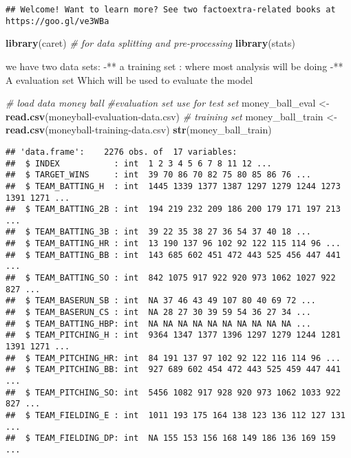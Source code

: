 \documentclass[
]{article}
\newenvironment{Shaded}{\begin{snugshade}}{\end{snugshade}}
\newcommand{\CommentTok}[1]{\textcolor[rgb]{0.56,0.35,0.01}{\textit{#1}}}
\newcommand{\FunctionTok}[1]{\textcolor[rgb]{0.13,0.29,0.53}{\textbf{#1}}}
\newcommand{\NormalTok}[1]{#1}
\newcommand{\OtherTok}[1]{\textcolor[rgb]{0.56,0.35,0.01}{#1}}
\newcommand{\StringTok}[1]{\textcolor[rgb]{0.31,0.60,0.02}{#1}}
\begin{document}
\begin{verbatim}
## Welcome! Want to learn more? See two factoextra-related books at https://goo.gl/ve3WBa
\end{verbatim}

\begin{Shaded}
\begin{Highlighting}[]
\FunctionTok{library}\NormalTok{(caret)  }\CommentTok{\# for data splitting and pre{-}processing}
\FunctionTok{library}\NormalTok{(stats) }
\end{Highlighting}
\end{Shaded}

we have two data sets: -** a training set : where most analysis will be
doing -** A evaluation set Which will be used to evaluate the model

\begin{Shaded}
\begin{Highlighting}[]
\CommentTok{\# load data money ball }
\CommentTok{\#evaluation set use for test set }
\NormalTok{money\_ball\_eval }\OtherTok{\textless{}{-}} \FunctionTok{read.csv}\NormalTok{(}\StringTok{\textquotesingle{}moneyball{-}evaluation{-}data.csv\textquotesingle{}}\NormalTok{)}
\CommentTok{\# training  set }
\NormalTok{money\_ball\_train }\OtherTok{\textless{}{-}} \FunctionTok{read.csv}\NormalTok{(}\StringTok{\textquotesingle{}moneyball{-}training{-}data.csv\textquotesingle{}}\NormalTok{)}
\FunctionTok{str}\NormalTok{(money\_ball\_train)}
\end{Highlighting}
\end{Shaded}

\begin{verbatim}
## 'data.frame':    2276 obs. of  17 variables:
##  $ INDEX           : int  1 2 3 4 5 6 7 8 11 12 ...
##  $ TARGET_WINS     : int  39 70 86 70 82 75 80 85 86 76 ...
##  $ TEAM_BATTING_H  : int  1445 1339 1377 1387 1297 1279 1244 1273 1391 1271 ...
##  $ TEAM_BATTING_2B : int  194 219 232 209 186 200 179 171 197 213 ...
##  $ TEAM_BATTING_3B : int  39 22 35 38 27 36 54 37 40 18 ...
##  $ TEAM_BATTING_HR : int  13 190 137 96 102 92 122 115 114 96 ...
##  $ TEAM_BATTING_BB : int  143 685 602 451 472 443 525 456 447 441 ...
##  $ TEAM_BATTING_SO : int  842 1075 917 922 920 973 1062 1027 922 827 ...
##  $ TEAM_BASERUN_SB : int  NA 37 46 43 49 107 80 40 69 72 ...
##  $ TEAM_BASERUN_CS : int  NA 28 27 30 39 59 54 36 27 34 ...
##  $ TEAM_BATTING_HBP: int  NA NA NA NA NA NA NA NA NA NA ...
##  $ TEAM_PITCHING_H : int  9364 1347 1377 1396 1297 1279 1244 1281 1391 1271 ...
##  $ TEAM_PITCHING_HR: int  84 191 137 97 102 92 122 116 114 96 ...
##  $ TEAM_PITCHING_BB: int  927 689 602 454 472 443 525 459 447 441 ...
##  $ TEAM_PITCHING_SO: int  5456 1082 917 928 920 973 1062 1033 922 827 ...
##  $ TEAM_FIELDING_E : int  1011 193 175 164 138 123 136 112 127 131 ...
##  $ TEAM_FIELDING_DP: int  NA 155 153 156 168 149 186 136 169 159 ...
\end{verbatim}
\end{document}
